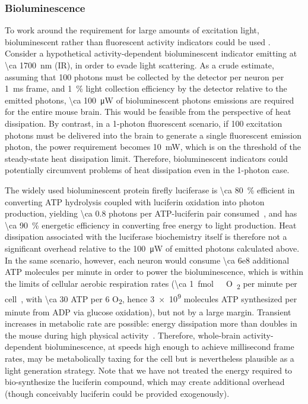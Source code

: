 \subsubsection{Bioluminescence}
To work around the requirement for large amounts of excitation light, bioluminescent rather than fluorescent activity indicators could be used \cite{naumann2010monitoring, martin2007vivo, martin2008vivo}.
Consider a hypothetical activity-dependent bioluminescent indicator emitting at \SI{\ca 1700}{\nano\meter} (IR), in order to evade light scattering.
As a crude estimate, assuming that 100 photons must be collected by the detector per neuron per \SI{1}{\milli\second} frame, and \SI{1}{\percent} light collection efficiency by the detector relative to the emitted photons, \SI{\ca 100}{\micro\watt} of bioluminescent photons emissions are required for the entire mouse brain.
This would be feasible from the perspective of heat dissipation.
By contrast, in a 1-photon fluorescent scenario, if 100 excitation photons must be delivered into the brain to generate a single fluorescent emission photon, the power requirement becomes \SI{10}{\milli\watt}, which is on the threshold of the steady-state heat dissipation limit.
Therefore, bioluminescent indicators could potentially circumvent problems of heat dissipation even in the 1-photon case.

The widely used bioluminescent protein firefly luciferase is \SI{\ca 80}{\percent} efficient in converting ATP hydrolysis coupled with luciferin oxidation into photon production, yielding \num{\ca 0.8} photons per ATP-luciferin pair consumed~\cite{seliger60}, and has \SI{\ca 90}{\percent} energetic efficiency in converting free energy to light production.
Heat dissipation associated with the luciferase biochemistry itself is therefore not a significant overhead relative to the \SI{100}{\micro\watt} of emitted photons calculated above. 
In the same scenario, however, each neuron would consume \num{\ca 6e8} additional ATP molecules per minute in order to power the bioluminescence, which is within the limits of cellular aerobic respiration rates (\SI{\ca 1}{\femto\mole\ O\textsubscript{2}} per minute per cell~\cite{molter09}, with \num{\ca 30} ATP per 6 O\textsubscript{2}, hence \num{3e9} molecules ATP synthesized per minute from ADP via glucose oxidation), but not by a large margin.
Transient increases in metabolic rate are possible: energy dissipation more than doubles in the mouse during high physical activity~\cite{speakman13}.
Therefore, whole-brain activity-dependent bioluminescence, at speeds high enough to achieve millisecond frame rates, may be metabolically taxing for the cell but is nevertheless plausible as a light generation strategy. Note that we have not treated the energy required to bio-synthesize the luciferin compound, which may create additional overhead (though conceivably luciferin could be provided exogenously).

